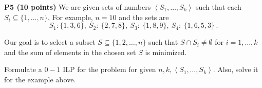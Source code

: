 \documentclass[11pt]{article}
\begin{document}
\medskip

\noindent\textbf{P5 (10 points)} We are given  sets of numbers
$\left\langle{S_1,\ldots,S_k}\right\rangle$ such that each $S_i \subseteq \{1,\ldots, n\}$.
For example, $n = 10$ and the sets are
\[ S_1: \{ 1,3,6\},\ S_2:\ \{2, 7, 8\},\ S_3:\ \{1,8,9\},\ S_4:\ \{1,6,5,3\} \,.\]

Our goal is to select a subset $S \subseteq \{ 1, 2, \ldots, n\}$ such that 
$S \cap S_i \not= \emptyset$ for $i = 1,\ldots, k$ and the sum of elements
in the chosen set $S$ is minimized.

Formulate a $0-1$ ILP for the problem for given $n, k, \left\langle{S_1,\ldots,S_k}\right\rangle$. Also,
 solve it for the example above.
\end{document}
